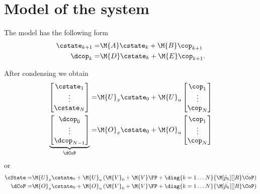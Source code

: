 \section{Model of the system}

The model has the following form
%
\begin{align}
    \cstate_{k+1} =& \M{A} \cstate_k + \M{B} \cop_{k+1}\\
    \dcop_k =& \M{D} \cstate_k + \M{E} \cop_{k+1}.
\end{align}
%

After condensing we obtain
%
\begin{align}
    \begin{bmatrix}
        \cstate_1 \\
        \vdots\\
        \cstate_{N}\\
    \end{bmatrix}
    =&
    \M{U}_x \cstate_0
    +
    \M{U}_u
    \begin{bmatrix}
        \cop_1 \\
        \vdots \\
        \cop_N \\
    \end{bmatrix} \\
%
    \underbrace{
    \begin{bmatrix}
        \dcop_0 \\
        \vdots\\
        \dcop_{N-1}\\
    \end{bmatrix}
    }_{\dCoP}
    =&
    \M{O}_x \cstate_0
    +
    \M{O}_u
    \begin{bmatrix}
        \cop_1 \\
        \vdots \\
        \cop_N \\
    \end{bmatrix} \\
\end{align}
%
or
%
\begin{align}
    \cState
    =&
    \M{U}_x \cstate_0
    +
    \M{U}_u
    \left(
        \M{V}_0
        +
        \M{V} \FP
        +
        \diag{k = 1 \dots N}{\M[\hat{p}_k][]{R}}
        \CoP
    \right)\\
%
    \dCoP
    =&
    \M{O}_x \cstate_0
    +
    \M{O}_u
    \left(
        \M{V}_0
        +
        \M{V} \FP
        +
        \diag{k = 1 \dots N}{\M[\hat{p}_k][]{R}}
        \CoP
    \right)\\
\end{align}
%

